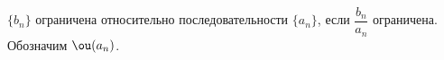 
    $\{b_n\}$ ограничена относительно последовательности $\{a_n\}$,
если $\dfrac{b_n}{a_n}$ ограничена. Обозначим $\ou(a_n)$.
